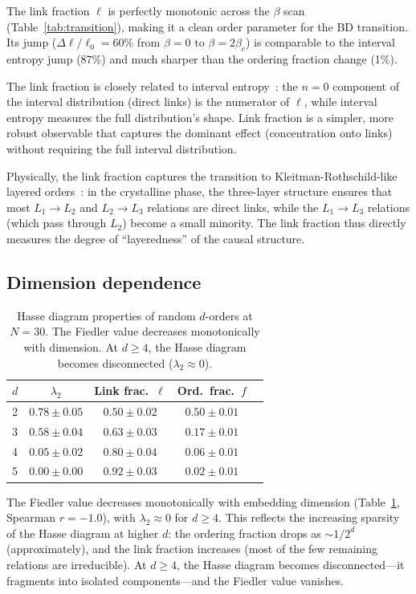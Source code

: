 \documentclass[aps,prd,twocolumn,superscriptaddress,nofootinbib]{revtex4-2}
\begin{document}
The link fraction $\ell$ is perfectly monotonic across the $\beta$ scan (Table~\ref{tab:transition}), making it a clean order parameter for the BD transition. Its jump ($\Delta \ell / \ell_0 = 60\%$ from $\beta = 0$ to $\beta = 2\beta_c$) is comparable to the interval entropy jump (87\%) and much sharper than the ordering fraction change (1\%).

The link fraction is closely related to interval entropy~\cite{loftus_interval}: the $n = 0$ component of the interval distribution (direct links) is the numerator of $\ell$, while interval entropy measures the full distribution's shape. Link fraction is a simpler, more robust observable that captures the dominant effect (concentration onto links) without requiring the full interval distribution.

Physically, the link fraction captures the transition to Kleitman-Rothschild-like layered orders~\cite{loomis2018}: in the crystalline phase, the three-layer structure ensures that most $L_1 \to L_2$ and $L_2 \to L_3$ relations are direct links, while the $L_1 \to L_3$ relations (which pass through $L_2$) become a small minority. The link fraction thus directly measures the degree of ``layeredness'' of the causal structure.

\subsection{Dimension dependence}

\begin{table}[h]
\centering
\begin{tabular}{lcccc}
\toprule
$d$ & $\lambda_2$ & Link frac.\ $\ell$ & Ord.\ frac.\ $f$ \\
\midrule
2 & $0.78 \pm 0.05$ & $0.50 \pm 0.02$ & $0.50 \pm 0.01$ \\
3 & $0.58 \pm 0.04$ & $0.63 \pm 0.03$ & $0.17 \pm 0.01$ \\
4 & $0.05 \pm 0.02$ & $0.80 \pm 0.04$ & $0.06 \pm 0.01$ \\
5 & $0.00 \pm 0.00$ & $0.92 \pm 0.03$ & $0.02 \pm 0.01$ \\
\bottomrule
\end{tabular}
\caption{Hasse diagram properties of random $d$-orders at $N = 30$. The Fiedler value decreases monotonically with dimension. At $d \geq 4$, the Hasse diagram becomes disconnected ($\lambda_2 \approx 0$).}
\label{tab:dimensions}
\end{table}

The Fiedler value decreases monotonically with embedding dimension (Table~\ref{tab:dimensions}, Spearman $r = -1.0$), with $\lambda_2 \approx 0$ for $d \geq 4$. This reflects the increasing sparsity of the Hasse diagram at higher $d$: the ordering fraction drops as $\sim 1/2^d$ (approximately), and the link fraction increases (most of the few remaining relations are irreducible). At $d \geq 4$, the Hasse diagram becomes disconnected---it fragments into isolated components---and the Fiedler value vanishes.
\end{document}
